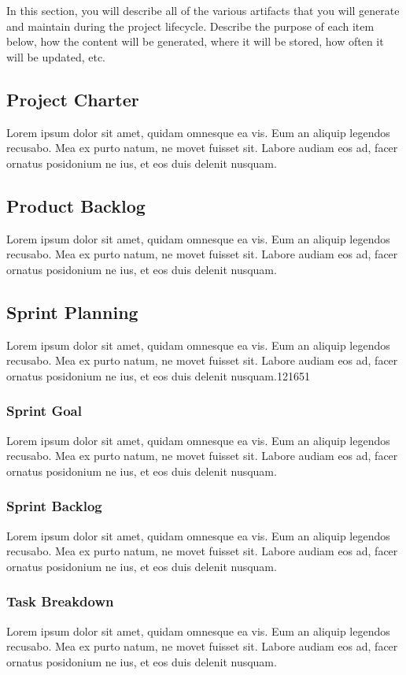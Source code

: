 In this section, you will describe all of the various artifacts that you will generate and maintain during the project lifecycle. Describe the purpose of each item below, how the content will be generated, where it will be stored, how often it will be updated, etc. 

\subsection{Project Charter}
Lorem ipsum dolor sit amet, quidam omnesque ea vis. Eum an aliquip legendos recusabo. Mea ex purto natum, ne movet fuisset sit. Labore audiam eos ad, facer ornatus posidonium ne ius, et eos duis delenit nusquam.

\subsection{Product Backlog}
Lorem ipsum dolor sit amet, quidam omnesque ea vis. Eum an aliquip legendos recusabo. Mea ex purto natum, ne movet fuisset sit. Labore audiam eos ad, facer ornatus posidonium ne ius, et eos duis delenit nusquam. 

\subsection{Sprint Planning}
Lorem ipsum dolor sit amet, quidam omnesque ea vis. Eum an aliquip legendos recusabo. Mea ex purto natum, ne movet fuisset sit. Labore audiam eos ad, facer ornatus posidonium ne ius, et eos duis delenit nusquam.121651

\subsubsection{Sprint Goal}
Lorem ipsum dolor sit amet, quidam omnesque ea vis. Eum an aliquip legendos recusabo. Mea ex purto natum, ne movet fuisset sit. Labore audiam eos ad, facer ornatus posidonium ne ius, et eos duis delenit nusquam.

\subsubsection{Sprint Backlog}
Lorem ipsum dolor sit amet, quidam omnesque ea vis. Eum an aliquip legendos recusabo. Mea ex purto natum, ne movet fuisset sit. Labore audiam eos ad, facer ornatus posidonium ne ius, et eos duis delenit nusquam.

\subsubsection{Task Breakdown}
Lorem ipsum dolor sit amet, quidam omnesque ea vis. Eum an aliquip legendos recusabo. Mea ex purto natum, ne movet fuisset sit. Labore audiam eos ad, facer ornatus posidonium ne ius, et eos duis delenit nusquam.

